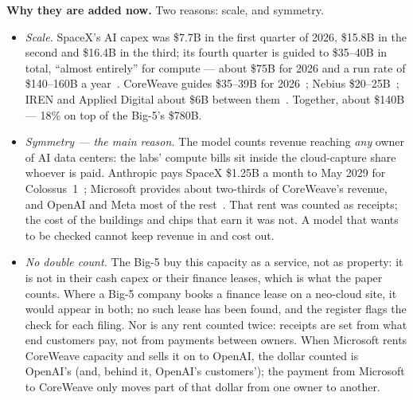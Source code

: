 \documentclass[11pt,letterpaper]{article}
\newcommand{\lead}[1]{{\color{leadwarm}\sffamily\bfseries #1}}
\begin{document}
\lead{Why they are added now.} Two reasons: scale, and symmetry.
\begin{itemize}
\item \emph{Scale.} SpaceX's AI capex was \$7.7B in the first quarter of 2026, \$15.8B in the second and \$16.4B in the third; its fourth quarter is guided to \$35--40B in total, ``almost entirely'' for compute --- about \$75B for 2026 and a run rate of \$140--160B a year~\cite{ref:baxtel_spacex_q2,ref:il_spacex_q3,ref:hl_spacex_q3,ref:basenor_spacex_q4}. CoreWeave guides \$35--39B for 2026~\cite{ref:crwv_q2_2026}; Nebius \$20--25B~\cite{ref:nebius_2026}; IREN and Applied Digital about \$6B between them~\cite{ref:iren_2026,ref:apld_fy26}. Together, about \$140B --- 18\% on top of the Big-5's \$780B.
\item \emph{Symmetry --- the main reason.} The model counts revenue reaching \emph{any} owner of AI data centers: the labs' compute bills sit inside the cloud-capture share whoever is paid. Anthropic pays SpaceX \$1.25B a month to May 2029 for Colossus~1~\cite{ref:baxtel_spacex_q2}; Microsoft provides about two-thirds of CoreWeave's revenue, and OpenAI and Meta most of the rest~\cite{ref:crwv_customers}. That rent was counted as receipts; the cost of the buildings and chips that earn it was not. A model that wants to be checked cannot keep revenue in and cost out.
\item \emph{No double count.} The Big-5 buy this capacity as a service, not as property: it is not in their cash capex or their finance leases, which is what the paper counts. Where a Big-5 company books a finance lease on a neo-cloud site, it would appear in both; no such lease has been found, and the register flags the check for each filing. Nor is any rent counted twice: receipts are set from what end customers pay, not from payments between owners. When Microsoft rents CoreWeave capacity and sells it on to OpenAI, the dollar counted is OpenAI's (and, behind it, OpenAI's customers'); the payment from Microsoft to CoreWeave only moves part of that dollar from one owner to another.
\end{itemize}
\end{document}
